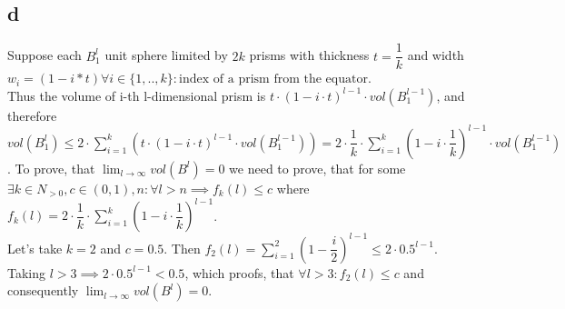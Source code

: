 \subsection*{d}
Suppose each $B^l_1$ unit sphere limited by $2k$ prisms with thickness $t = \dfrac{1}{k}$ and width $w_i = (1 - i*t) \forall i \in \{1, .. , k\}: \text{index of a prism from the equator}$.\\
Thus the volume of i-th l-dimensional prism is $t \cdot (1 - i\cdot t)^{l-1} \cdot vol(B^{l-1}_1)$, and therefore
$vol(B^l_1) \leq 2\cdot \sum_{i=1}^{k}(t \cdot (1 - i\cdot t)^{l-1} \cdot vol(B^{l-1}_1)) = 
	2\cdot \dfrac{1}{k} \cdot \sum_{i = 1}^{k}
	(1 - i\cdot \dfrac{1}{k})^{l-1} \cdot 
	vol(B^{l-1}_1)
$. To prove, that $\lim_{l \to \infty} vol(B^l) = 0$ we need to prove, that for some $\exists k\in N_{>0}, c \in (0,1), n : \forall l > n \implies f_k(l) \leq c$ where $f_k(l) = 2\cdot \dfrac{1}{k} \cdot \sum_{i=1}^{k} (1 - i\cdot \dfrac{1}{k})^{l-1}$.\\ 
Let's take $k = 2$ and $c = 0.5$. Then $f_2(l) = \sum_{i = 1}^{2} (1 - \dfrac{i}{2})^{l-1} \leq 2\cdot 0.5^{l-1}$. Taking $l > 3 \implies 2\cdot 0.5^{l-1} < 0.5$, which proofs, that  $\forall l > 3: f_2(l) \leq c $ and consequently $\lim_{l \to \infty} vol(B^l) = 0$.